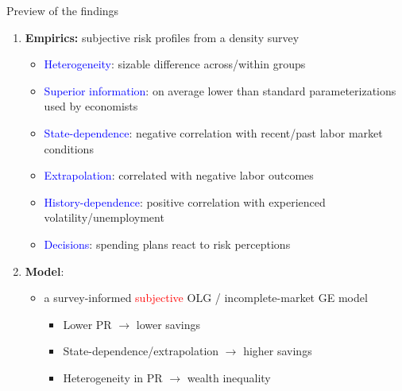 \documentclass{beamer}
\begin{document}
\begin{frame}{Preview of the findings}
	\begin{enumerate}
		\item \textbf{Empirics:} subjective risk profiles from a density survey
		\begin{itemize}
			\item \textcolor{blue}{Heterogeneity}: sizable difference across/within groups
			\item \textcolor{blue}{Superior information}: on average lower than standard parameterizations used by economists 
			\item \textcolor{blue}{State-dependence}: negative correlation with recent/past labor market conditions 
				\item \textcolor{blue}{Extrapolation}:  correlated with negative labor outcomes
			\item \textcolor{blue}{History-dependence}: positive correlation with experienced volatility/unemployment 
			\item \textcolor{blue}{Decisions}: spending plans react to risk perceptions
			

		
		\end{itemize}
\pause
		\item \textbf{Model}: 
		\begin{itemize}
			\item a survey-informed \textcolor{red}{subjective} OLG / incomplete-market GE model 
\begin{itemize}
	\item Lower PR $\rightarrow$ lower savings
	\item State-dependence/extrapolation $\rightarrow$ higher savings
	\item Heterogeneity in PR $\rightarrow$ wealth inequality 
\end{itemize}
		\end{itemize} 
	\end{enumerate}
\end{frame}
\end{document}
